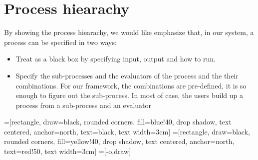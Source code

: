 \documentclass{report}
\begin{document}
\section{Process hiearachy}
\par By showing  the process hiearachy, we would like emphasize that, in our system, a process can be specified
in two ways:
\begin{itemize}
\item Treat as a black box by specifying input, output and how to run.
\item Specify the sub-processes and the evaluators of the process and the their combinations. For our
framework, the combinations are pre-defined, it is so enough to figure out the sub-process. In most of case,
the users build up a process from a sub-process and an evaluator
\end{itemize}
=[rectangle, draw=black, rounded corners, fill=blue!40, drop shadow,
        text centered, anchor=north, text=black, text width=3cm]
=[rectangle, draw=black, rounded corners, fill=yellow!40, drop shadow,
        text centered, anchor=north, text=red!50, text width=3cm]
=[-o,draw]
\end{document}
